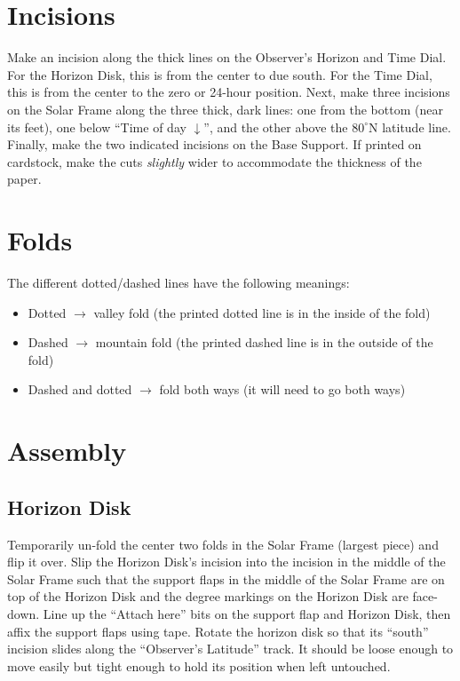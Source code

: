 \documentclass[tikz]{article}
\begin{document}
\begin{multicols}{2}
	\section{Incisions}
	Make an incision along the thick lines on the Observer's Horizon and Time Dial. For the Horizon Disk, this is from the center to due south. For the Time Dial, this is from the center to the zero or 24-hour position. Next, make three incisions on the Solar Frame along the three thick, dark lines: one from the bottom (near its feet), one below ``Time of day $\downarrow$'', and the other above the $80^\circ$N latitude line. Finally, make the two indicated incisions on the Base Support. If printed on cardstock, make the cuts \emph{slightly} wider to accommodate the thickness of the paper. %
	
	
	\section{Folds}
	The different dotted/dashed lines have the following meanings: 
	\begin{itemize}
		\item Dotted $\rightarrow$ valley fold (the printed dotted line is in the inside of the fold)
		\item Dashed $\rightarrow$ mountain fold (the printed dashed line is in the outside of the fold)
		\item Dashed and dotted $\rightarrow$ fold both ways (it will need to go both ways)
	\end{itemize}
	
	
	
	
	\section{Assembly}
	\subsection{Horizon Disk}
	Temporarily un-fold the center two folds in the Solar Frame (largest piece) and flip it over. Slip the Horizon Disk's incision into the incision in the middle of the Solar Frame such that the support flaps in the middle of the Solar Frame are on top of the Horizon Disk and the degree markings on the Horizon Disk are face-down. Line up the ``Attach here'' bits on the support flap and Horizon Disk, then affix the support flaps using tape. Rotate the horizon disk so that its ``south'' incision slides along the ``Observer's Latitude'' track. It should be loose enough to move easily but tight enough to hold its position when left untouched.
	

\end{multicols}
\end{document}
